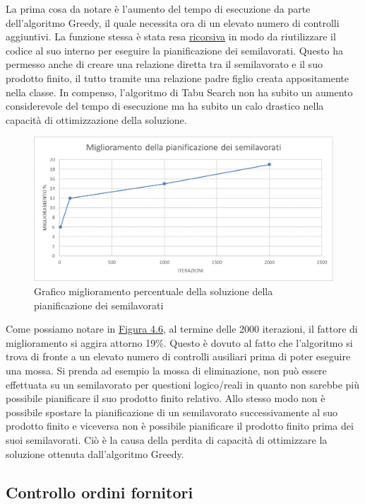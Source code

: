 La prima cosa da notare è l'aumento del tempo di esecuzione da parte dell'algoritmo Greedy, il quale necessita ora di un elevato numero di controlli aggiuntivi. La funzione
stessa è stata resa \hyperref[Ricorsione]{ricorsiva\glo} in modo da riutilizzare il codice al suo interno per eseguire la pianificazione dei semilavorati. Questo ha permesso anche di creare una
relazione diretta tra il semilavorato e il suo prodotto finito, il tutto tramite una relazione padre figlio creata appositamente nella classe.
In compenso, l'algoritmo di Tabu Search non ha subito un aumento considerevole del tempo di esecuzione ma ha subito un calo drastico nella capacità di ottimizzazione della
soluzione.

\begin{figure}[H]
	\includegraphics[width=13cm]{immagini/graficosl3.png}
	\centering
    \caption{Grafico miglioramento percentuale della soluzione della pianificazione dei semilavorati}
    \label{4.6}
\end{figure}

Come possiamo notare in \hyperref[4.6]{Figura 4.6}, al termine delle 2000 iterazioni, il fattore di miglioramento si aggira attorno 19\%. Questo è dovuto al fatto che l'algoritmo
si trova di fronte a un elevato numero di controlli ausiliari prima di poter eseguire una mossa. Si prenda ad esempio la mossa di eliminazione, non può essere effettuata su un semilavorato
per questioni logico/reali in quanto non sarebbe più possibile pianificare il suo prodotto finito relativo. Allo stesso modo non è possibile spostare la pianificazione di un
semilavorato successivamente al suo prodotto finito e viceversa non è possibile pianificare il prodotto finito prima dei suoi semilavorati. Ciò è la causa della perdita di
capacità di ottimizzare la soluzione ottenuta dall'algoritmo Greedy.


\subsection{Controllo ordini fornitori}

